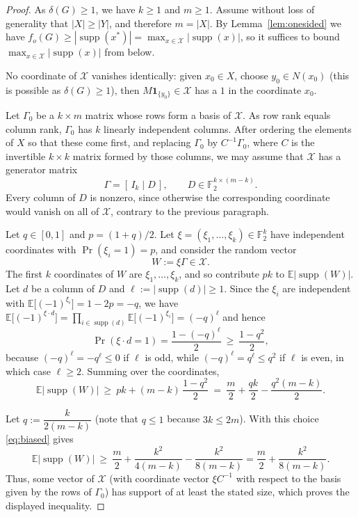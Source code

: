\documentclass[11pt]{article}
\theoremstyle{definition}
\theoremstyle{remark}
\newcommand{\supp}{\operatorname{supp}}
\newcommand{\fo}{f_o}
\newcommand{\1}{\mathbf{1}}
\begin{document}
	\begin{proof}
		As $\delta(G)\geq 1$, we have $k\ge1$ and $m\ge1$. Assume without loss of generality that $|X|\ge|Y|$, and therefore $m=|X|$. By Lemma~\ref{lem:onesided} we have $\fo(G)\ge|\supp(x^{*})|=\max_{x\in\mathcal{X}}|\supp(x)|$, so it suffices to bound $\max_{x\in\mathcal{X}}|\supp(x)|$ from below.
		
		No coordinate of $\mathcal{X}$ vanishes identically: given $x_0\in X$, choose $y_0\in N(x_0)$ (this is possible as $\delta(G)\ge1$), then $M\mathbf{1}_{\{y_0\}}\in\mathcal{X}$ has a $1$ in the coordinate $x_0$.
		
		Let $\Gamma_0$ be a $k\times m$ matrix whose rows form a basis of $\mathcal{X}$. As row rank equals column rank, $\Gamma_0$ has $k$ linearly independent columns. After ordering the elements of $X$ so that these come first, and replacing $\Gamma_0$ by $C^{-1}\Gamma_0$, where $C$ is the invertible $k\times k$ matrix formed by those columns, we may assume that $\mathcal{X}$ has a generator matrix
		\[
		\Gamma=[\,I_k\mid D\,],\qquad D\in\mathbb{F}_2^{k\times(m-k)} .
		\]
		Every column of $D$ is nonzero, since otherwise the corresponding coordinate would vanish on all of $\mathcal{X}$, contrary to the previous paragraph.
		
		Let $q\in[0,1]$ and $p=(1+q)/2$. Let $\xi=(\xi_1,\dots,\xi_k)\in\mathbb{F}_2^{k}$ have independent coordinates with $\Pr(\xi_i=1)=p$, and consider the random vector
		\[
		W:=\xi\Gamma\in\mathcal{X} .
		\]
		The first $k$ coordinates of $W$ are $\xi_1,\dots,\xi_k$, and so contribute $pk$ to $\mathbb{E}|\supp(W)|$. Let $d$ be a column of $D$ and $\ell:=|\supp(d)|\ge1$. Since the $\xi_i$ are independent with $\mathbb{E}\bigl[(-1)^{\xi_i}\bigr]=1-2p=-q$, we have $\mathbb{E}\bigl[(-1)^{\xi\cdot d}\bigr]=\prod_{i\in \supp(d)}\mathbb{E}\bigl[(-1)^{\xi_i}\bigr]=(-q)^{\ell}$ and hence
		\[
		\Pr(\xi\cdot d=1)=\frac{1-(-q)^{\ell}}{2}\ \ge\ \frac{1-q^{2}}{2},
		\]
		because $(-q)^{\ell}=-q^{\ell}\le0$ if $\ell$ is odd, while $(-q)^{\ell}=q^{\ell}\le q^{2}$ if $\ell$ is even, in which case $\ell\ge2$. Summing over the coordinates,
		\begin{equation}\label{eq:biased}
			\mathbb{E}|\supp(W)|\ \ge\ pk+(m-k)\,\frac{1-q^{2}}{2}
			\ =\ \frac{m}{2}+\frac{qk}{2}-\frac{q^{2}(m-k)}{2}.
		\end{equation}
		
		Let $q:=\dfrac{k}{2(m-k)}$ (note that $q\le1$ because $3k\le2m$). With this choice \eqref{eq:biased} gives
		\[
		\mathbb{E}|\supp(W)|\ \ge\ \frac{m}{2}+\frac{k^{2}}{4(m-k)}-\frac{k^{2}}{8(m-k)}=\frac{m}{2}+\frac{k^{2}}{8(m-k)} .
		\]
		Thus, some vector of $\mathcal{X}$ (with coordinate vector $\xi C^{-1}$ with respect to the basis given by the rows of $\Gamma_0$) has support of at least the stated size, which proves the displayed inequality.
	\end{proof}
	
\end{document}
